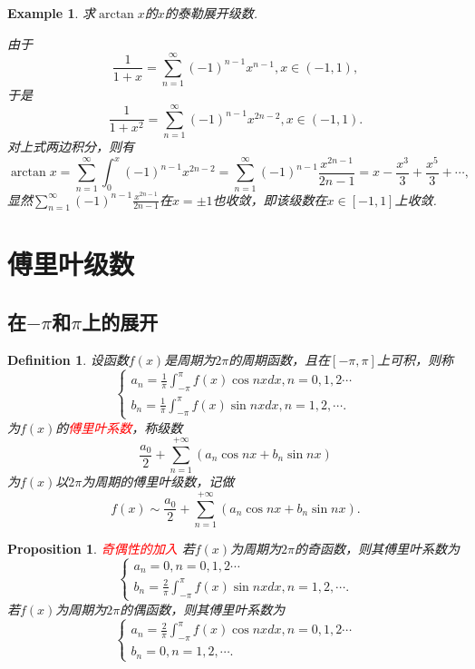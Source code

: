 \documentclass{article}
\newtheorem{proposition}[theorem]{Proposition}
\newtheorem{example}[theorem]{Example}
\newtheorem{definition}[theorem]{Definition}
\newcommand{\redt}[1]{\textcolor{red}{#1}}
\begin{document}
\begin{example}
\rm 求$\arctan x$的$x$的泰勒展开级数.

\rm 由于
$$
\frac{1}{1+x} = \sum\limits_{n=1}^{\infty} (-1)^{n-1}x^{n-1}, x \in (-1,1), 
$$
于是
$$
\frac{1}{1+x^2} = \sum\limits_{n=1}^{\infty} (-1)^{n-1}x^{2n-2}, x \in (-1,1). 
$$
对上式两边积分，则有
$$
\arctan x = \sum\limits_{n=1}^{\infty} \int_0^{x} (-1)^{n-1}x^{2n-2}  =   \sum\limits_{n=1}^{\infty}(-1)^{n-1}\frac{x^{2n-1}}{2n-1} = x - \frac{x^3}{3} + \frac{x^5}{3} + \cdots,
$$
显然$\sum\limits_{n=1}^{\infty}(-1)^{n-1}\frac{x^{2n-1}}{2n-1}$在$x = \pm 1$也收敛，即该级数在$x \in [-1,1]$上收敛. 
\end{example}


\newpage
\section{傅里叶级数}
\subsection{在$-\pi$和$\pi$上的展开}
\begin{definition}
\rm 设函数$f(x)$是周期为$2\pi$的周期函数，且在$[-\pi,\pi]$上可积，则称
$$
\left\{
\begin{array}{ll}
a_n = \frac{1}{\pi} \int_{-\pi}^{\pi} f(x)\cos nxdx, n =  0,1,2\cdots \\
b_n = \frac{1}{\pi} \int_{-\pi}^{\pi} f(x)\sin nxdx, n = 1,2,\cdots.
\end{array} \right.
$$
为$f(x)$的\redt{傅里叶系数}，称级数
$$
\frac{a_0}{2} + \sum\limits_{n=1}^{+\infty}(a_n\cos nx + b_n \sin nx)
$$
为$f(x)$以$2\pi$为周期的傅里叶级数，记做
$$
f(x) \sim \frac{a_0}{2} +  \sum\limits_{n=1}^{+\infty}(a_n\cos nx + b_n \sin nx).
$$
\end{definition}

\begin{proposition}
\rm \redt{奇偶性的加入} 若$f(x)$为周期为$2\pi$的奇函数，则其傅里叶系数为
$$
\left\{
\begin{array}{ll}
a_n = 0, n =  0,1,2\cdots \\
b_n = \frac{2}{\pi} \int_{-\pi}^{\pi} f(x)\sin nxdx, n = 1,2,\cdots.
\end{array} \right.
$$
若$f(x)$为周期为$2\pi$的偶函数，则其傅里叶系数为
$$
\left\{
\begin{array}{ll}
a_n = \frac{2}{\pi} \int_{-\pi}^{\pi} f(x)\cos nxdx, n =  0,1,2\cdots \\
b_n = 0 , n = 1,2,\cdots.
\end{array} \right.
$$
\end{proposition}
\end{document}
